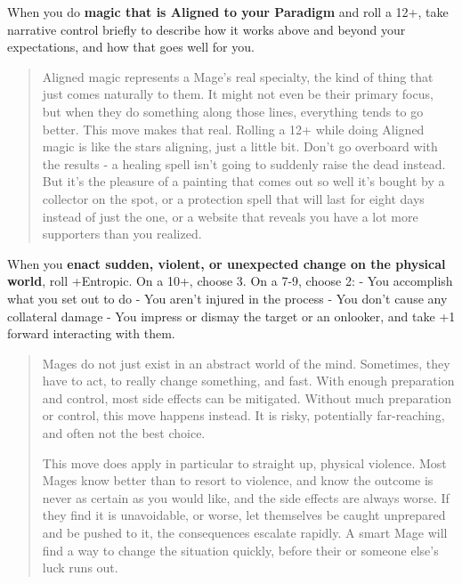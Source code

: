 \documentclass[
  oneside,
  statementpaper,
  9pt]{memoir}
\begin{document}
When you do \textbf{magic that is Aligned to your Paradigm} and roll a
12+, take narrative control briefly to describe how it works above and
beyond your expectations, and how that goes well for you.

\begin{quote}
Aligned magic represents a Mage's real specialty, the kind of thing that
just comes naturally to them. It might not even be their primary focus,
but when they do something along those lines, everything tends to go
better. This move makes that real. Rolling a 12+ while doing Aligned
magic is like the stars aligning, just a little bit. Don't go overboard
with the results - a healing spell isn't going to suddenly raise the
dead instead. But it's the pleasure of a painting that comes out so well
it's bought by a collector on the spot, or a protection spell that will
last for eight days instead of just the one, or a website that reveals
you have a lot more supporters than you realized.
\end{quote}

When you \textbf{enact sudden, violent, or unexpected change on the
physical world}, roll +Entropic. On a 10+, choose 3. On a 7-9, choose 2:
- You accomplish what you set out to do - You aren't injured in the
process - You don't cause any collateral damage - You impress or dismay
the target or an onlooker, and take +1 forward interacting with them.

\begin{quote}
Mages do not just exist in an abstract world of the mind. Sometimes,
they have to act, to really change something, and fast. With enough
preparation and control, most side effects can be mitigated. Without
much preparation or control, this move happens instead. It is risky,
potentially far-reaching, and often not the best choice.

This move does apply in particular to straight up, physical violence.
Most Mages know better than to resort to violence, and know the outcome
is never as certain as you would like, and the side effects are always
worse. If they find it is unavoidable, or worse, let themselves be
caught unprepared and be pushed to it, the consequences escalate
rapidly. A smart Mage will find a way to change the situation quickly,
before their or someone else's luck runs out.
\end{quote}
\end{document}
